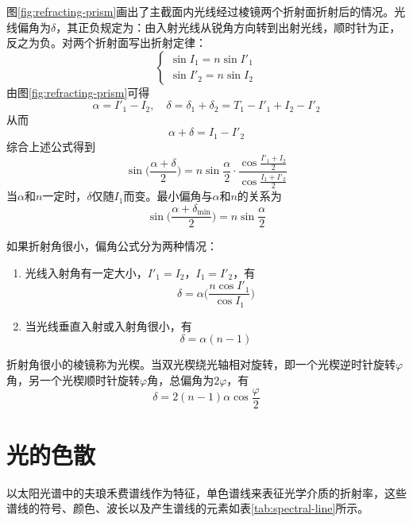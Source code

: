 \documentclass[cn,11pt]{elegantbook}
\begin{document}
图\ref{fig:refracting-prism}画出了主截面内光线经过棱镜两个折射面折射后的情况。光线偏角为$\delta$，其正负规定为：由入射光线从锐角方向转到出射光线，顺时针为正，反之为负。对两个折射面写出折射定律：
\begin{equation}
\begin{cases}
\sin I_1=n\sin I'_1\\
\sin I'_2=n\sin I_2
\end{cases}
\end{equation}
由图\ref{fig:refracting-prism}可得
\begin{equation}
\alpha=I'_1-I_2,\quad\delta=\delta_1+\delta_2=T_1-I'_1+I_2-I'_2
\end{equation}
从而
\begin{equation}
\alpha+\delta=I_1-I'_2
\end{equation}
综合上述公式得到
\begin{equation}
\sin\bigg(\frac{\alpha+\delta}{2}\bigg)=n\sin\frac{\alpha}{2}\cdot\frac{\cos\frac{I'_1+I_2}{2}}{\cos\frac{I_1+I'_2}{2}}
\end{equation}
当$\alpha$和$n$一定时，$\delta$仅随$I_1$而变。最小偏角与$\alpha$和$n$的关系为
\begin{equation}
\sin\bigg(\frac{\alpha+\delta_{\mathrm{min}}}{2}\bigg)=n\sin\frac{\alpha}{2}
\label{eq:minimum-deviation-angle}
\end{equation}

如果折射角很小，偏角公式分为两种情况：
\begin{enumerate}
	\item 光线入射角有一定大小，$I'_1=I_2$，$I_1=I'_2$，有
	\begin{equation}
	\delta=\alpha\bigg(\frac{n\cos I'_1}{\cos I_1}\bigg)
	\end{equation}
	\item 当光线垂直入射或入射角很小，有
	\begin{equation}
	\delta=\alpha(n-1)
	\end{equation}
\end{enumerate}

折射角很小的棱镜称为光楔。当双光楔绕光轴相对旋转，即一个光楔逆时针旋转$\varphi$角，另一个光楔顺时针旋转$\varphi$角，总偏角为$2\varphi$，有
\begin{equation}
\delta=2(n-1)\alpha\cos\frac{\varphi}{2}
\end{equation}

\section{光的色散}
以太阳光谱中的夫琅禾费谱线作为特征，单色谱线来表征光学介质的折射率，这些谱线的符号、颜色、波长以及产生谱线的元素如表\ref{tab:spectral-line}所示。
\end{document}
